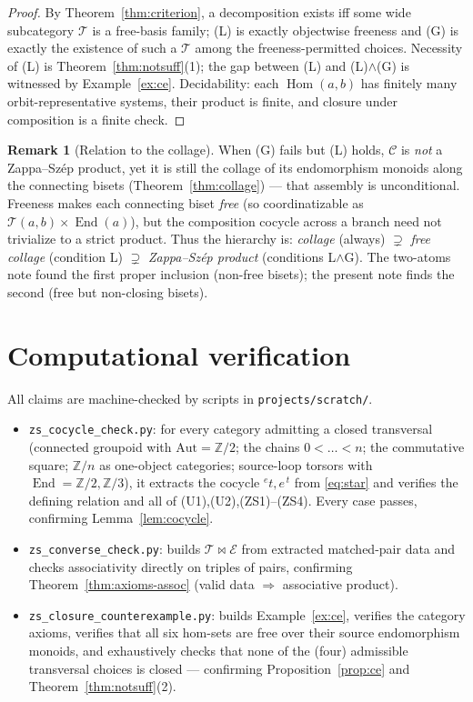 \documentclass[11pt]{article}
\theoremstyle{definition}
\newtheorem{remark}[theorem]{Remark}
\newcommand{\Hom}{\operatorname{Hom}}
\newcommand{\End}{\operatorname{End}}
\newcommand{\C}{\mathcal{C}}
\newcommand{\T}{\mathcal{T}}
\newcommand{\E}{\mathcal{E}}
\newcommand{\lact}[2]{{}^{#1}\!#2}      %
\newcommand{\rest}[2]{#1^{\,#2}}        %
\begin{document}
\begin{proof}
By Theorem~\ref{thm:criterion}, a decomposition exists iff some wide subcategory
$\T$ is a free-basis family; (L) is exactly objectwise freeness and (G) is exactly
the existence of such a $\T$ among the freeness-permitted choices. Necessity of
(L) is Theorem~\ref{thm:notsuff}(1); the gap between (L) and (L)$\wedge$(G) is
witnessed by Example~\ref{ex:ce}. Decidability: each $\Hom(a,b)$ has finitely many
orbit-representative systems, their product is finite, and closure under
composition is a finite check.
\end{proof}

\begin{remark}[Relation to the collage]
When (G) fails but (L) holds, $\C$ is \emph{not} a Zappa--Sz\'ep product, yet it
is still the collage of its endomorphism monoids along the connecting bisets
(Theorem~\ref{thm:collage}) --- that assembly is unconditional. Freeness makes
each connecting biset \emph{free} (so coordinatizable as $\T(a,b)\times\End(a)$),
but the composition cocycle across a branch need not trivialize to a strict
product. Thus the hierarchy is: \emph{collage} (always) $\supsetneq$ \emph{free
collage} (condition L) $\supsetneq$ \emph{Zappa--Sz\'ep product} (conditions
L$\wedge$G). The two-atoms note found the first proper inclusion (non-free
bisets); the present note finds the second (free but non-closing bisets).
\end{remark}

\section{Computational verification}\label{sec:comp}

All claims are machine-checked by scripts in \texttt{projects/scratch/}.
\begin{itemize}
\item \texttt{zs\_cocycle\_check.py}: for every category admitting a closed
transversal (connected groupoid with $\mathrm{Aut}=\mathbb Z/2$; the chains
$0<\dots<n$; the commutative square; $\mathbb Z/n$ as one-object categories;
source-loop torsors with $\End=\mathbb Z/2,\mathbb Z/3$), it extracts the cocycle
$\lact{e}{t},\rest{e}{t}$ from \eqref{eq:star} and verifies the defining relation
and all of (U1),(U2),(ZS1)--(ZS4). Every case passes, confirming
Lemma~\ref{lem:cocycle}.
\item \texttt{zs\_converse\_check.py}: builds $\T\bowtie\E$ from extracted
matched-pair data and checks associativity directly on triples of pairs,
confirming Theorem~\ref{thm:axioms-assoc} (valid data $\Rightarrow$ associative
product).
\item \texttt{zs\_closure\_counterexample.py}: builds Example~\ref{ex:ce},
verifies the category axioms, verifies that all six hom-sets are free over their
source endomorphism monoids, and exhaustively checks that none of the (four)
admissible transversal choices is closed --- confirming
Proposition~\ref{prop:ce} and Theorem~\ref{thm:notsuff}(2).
\end{itemize}
\end{document}
